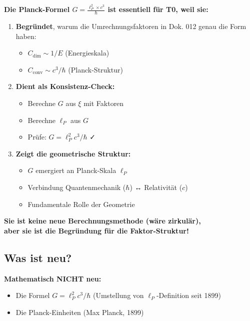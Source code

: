 	\begin{revolution}
		\textbf{Die Planck-Formel $G = \frac{\ell_P^2 \times c^3}{\hbar}$ ist essentiell für T0, weil sie:}
		
		\begin{enumerate}
			\item \textbf{Begründet}, warum die Umrechnungsfaktoren in Dok. 012 genau die Form haben:
			\begin{itemize}
				\item $C_{\text{dim}} \sim 1/E$ (Energieskala)
				\item $C_{\text{conv}} \sim c^3/\hbar$ (Planck-Struktur)
			\end{itemize}
			
			\item \textbf{Dient als Konsistenz-Check:}
			\begin{itemize}
				\item Berechne $G$ aus $\xi$ mit Faktoren
				\item Berechne $\ell_P$ aus $G$
				\item Prüfe: $G = \ell_P^2 c^3/\hbar$ ✓
			\end{itemize}
			
			\item \textbf{Zeigt die geometrische Struktur:}
			\begin{itemize}
				\item $G$ emergiert an Planck-Skala $\ell_P$
				\item Verbindung Quantenmechanik ($\hbar$) ↔ Relativität ($c$)
				\item Fundamentale Rolle der Geometrie
			\end{itemize}
		\end{enumerate}
		
		\textbf{Sie ist keine neue Berechnungsmethode (wäre zirkulär), \\
			aber sie ist die Begründung für die Faktor-Struktur!}
	\end{revolution}
	
	\subsection{Was ist neu?}
	
	\textbf{Mathematisch NICHT neu:}
	\begin{itemize}
		\item Die Formel $G = \ell_P^2 c^3/\hbar$ (Umstellung von $\ell_P$-Definition seit 1899)
		\item Die Planck-Einheiten (Max Planck, 1899)
	\end{itemize}
	
